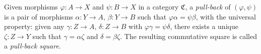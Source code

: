 Given morphisms $\varphi : A \to X$ and $\psi : B \to X$ in a category $\mathfrak{C}$, a \textit{pull-back} of $(\varphi, \psi)$ is a pair of morphisms $\alpha : Y \to A$, $\beta : Y \to B$ such that $\varphi \alpha = \psi \beta$, with the universal property: given any $\gamma : Z \to A$, $\delta : Z \to B$ with $\varphi \gamma = \psi \delta$, there exists a unique $\zeta : Z \to Y$ such that $\gamma = \alpha \zeta$ and $\delta = \beta \zeta$. The resulting commutative square is called a \textit{pull-back square}.
